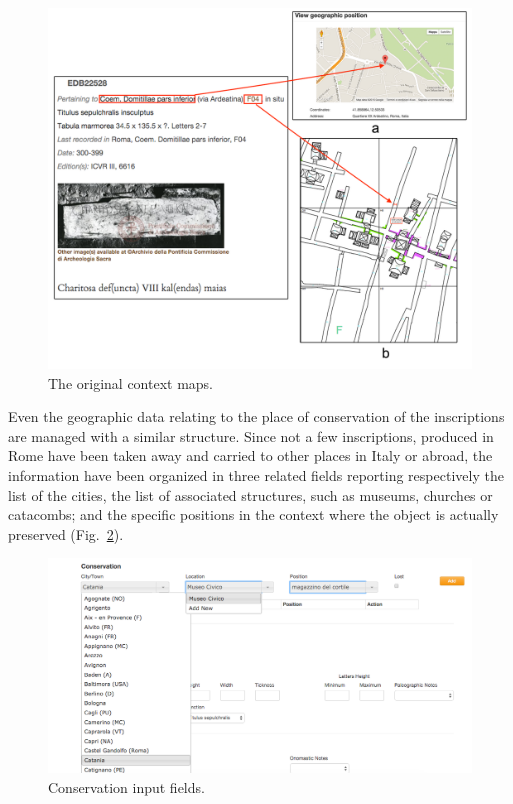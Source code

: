 \documentclass[amsthm,ebook]{saparticle}
\begin{document}
 \begin{figure}[!hbp]
\centering
 \includegraphics[width=0.9\columnwidth]{EAGLE2016Roccoengrev-img006.png} 
\caption{The original context maps.}
\label{fig:6}
\end{figure}


Even the geographic data relating to the place of conservation of the inscriptions are managed with a similar structure.
Since not a few inscriptions, produced in Rome have been taken away and carried to other places in Italy or abroad, the
information have been organized in three related fields reporting respectively the list of the cities, the list of
associated structures, such as museums, churches or catacombs; and the specific positions in the context where the
object is actually preserved (Fig.~\ref{fig:7}).




\begin{figure}[!hbp]
\centering
 \includegraphics[width=\columnwidth]{Fig7.png}
\caption{Conservation input fields.}
\label{fig:7}
\end{figure}
\end{document}
